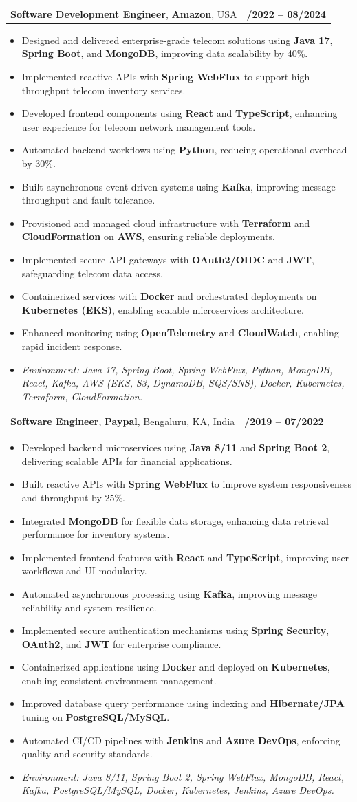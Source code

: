 \documentclass[letterpaper,11pt]{article}
\makeatletter
\newcommand{\resumeItem}[1]{
  \item\footnotesize{
    {#1 \vspace{-2pt}}
  }
}
\newcommand{\resumeSubheading}[4]{
  \vspace{-2pt}\item
    \begin{tabular*}{1.0\textwidth}[t]{l@{\extracolsep{\fill}}r}
      \textbf{\fontsize{10pt}{14pt}\selectfont #3}, \textbf{\fontsize{10pt}{14pt}\selectfont #1}, \fontsize{10pt}{14pt}\selectfont #4 & \textbf{\fontsize{10pt}{14pt}\selectfont #2} \\
    \end{tabular*}\vspace{-7pt}
}
\newcommand{\resumeItemListStart}{\begin{itemize}[leftmargin=*]}
\newcommand{\resumeItemListEnd}{\end{itemize}\vspace{-5pt}}
\makeatother
\begin{document}
\resumeSubheading
{Amazon}{10/2022 -- 08/2024}
{Software Development Engineer}{USA}
\resumeItemListStart
  \resumeItem{Designed and delivered enterprise-grade telecom solutions using \textbf{Java 17}, \textbf{Spring Boot}, and \textbf{MongoDB}, improving data scalability by 40\%.}
  \resumeItem{Implemented reactive APIs with \textbf{Spring WebFlux} to support high-throughput telecom inventory services.}
  \resumeItem{Developed frontend components using \textbf{React} and \textbf{TypeScript}, enhancing user experience for telecom network management tools.}
  \resumeItem{Automated backend workflows using \textbf{Python}, reducing operational overhead by 30\%.}
  \resumeItem{Built asynchronous event-driven systems using \textbf{Kafka}, improving message throughput and fault tolerance.}
  \resumeItem{Provisioned and managed cloud infrastructure with \textbf{Terraform} and \textbf{CloudFormation} on \textbf{AWS}, ensuring reliable deployments.}
  \resumeItem{Implemented secure API gateways with \textbf{OAuth2/OIDC} and \textbf{JWT}, safeguarding telecom data access.}
  \resumeItem{Containerized services with \textbf{Docker} and orchestrated deployments on \textbf{Kubernetes (EKS)}, enabling scalable microservices architecture.}
  \resumeItem{Enhanced monitoring using \textbf{OpenTelemetry} and \textbf{CloudWatch}, enabling rapid incident response.}
  \resumeItem{\textit{Environment: Java 17, Spring Boot, Spring WebFlux, Python, MongoDB, React, Kafka, AWS (EKS, S3, DynamoDB, SQS/SNS), Docker, Kubernetes, Terraform, CloudFormation.}}
\resumeItemListEnd

\resumeSubheading
{Paypal}{08/2019 -- 07/2022}
{Software Engineer}{Bengaluru, KA, India}
\resumeItemListStart
  \resumeItem{Developed backend microservices using \textbf{Java 8/11} and \textbf{Spring Boot 2}, delivering scalable APIs for financial applications.}
  \resumeItem{Built reactive APIs with \textbf{Spring WebFlux} to improve system responsiveness and throughput by 25\%.}
  \resumeItem{Integrated \textbf{MongoDB} for flexible data storage, enhancing data retrieval performance for inventory systems.}
  \resumeItem{Implemented frontend features with \textbf{React} and \textbf{TypeScript}, improving user workflows and UI modularity.}
  \resumeItem{Automated asynchronous processing using \textbf{Kafka}, improving message reliability and system resilience.}
  \resumeItem{Implemented secure authentication mechanisms using \textbf{Spring Security}, \textbf{OAuth2}, and \textbf{JWT} for enterprise compliance.}
  \resumeItem{Containerized applications using \textbf{Docker} and deployed on \textbf{Kubernetes}, enabling consistent environment management.}
  \resumeItem{Improved database query performance using indexing and \textbf{Hibernate/JPA} tuning on \textbf{PostgreSQL/MySQL}.}
  \resumeItem{Automated CI/CD pipelines with \textbf{Jenkins} and \textbf{Azure DevOps}, enforcing quality and security standards.}
  \resumeItem{\textit{Environment: Java 8/11, Spring Boot 2, Spring WebFlux, MongoDB, React, Kafka, PostgreSQL/MySQL, Docker, Kubernetes, Jenkins, Azure DevOps.}}
\resumeItemListEnd
\end{document}
